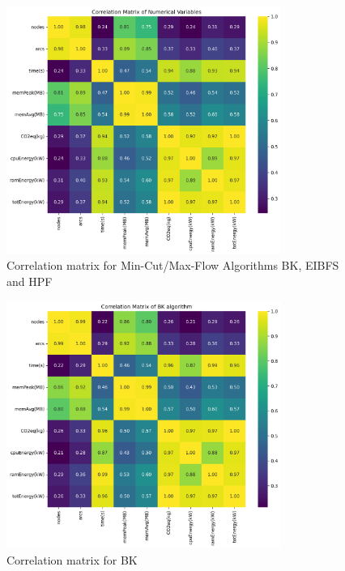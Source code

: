 \documentclass[a4paper,singleside,12pt]{report} %
\begin{document}
\begin{figure}[h!]
    \centering
    \includegraphics[width=0.8\textwidth]{imgs/max_flow_corr_mat.png}
    \caption{Correlation matrix for Min-Cut/Max-Flow Algorithms BK, EIBFS and HPF}
    \label{fig:max_flow_corr_mat}
\end{figure}

\begin{figure}[h!]
    \centering
    \includegraphics[width=0.8\textwidth]{imgs/bk_corr_mat.png}
    \caption{Correlation matrix for BK}
    \label{fig:bk_orr_mat}
\end{figure}
\end{document}
